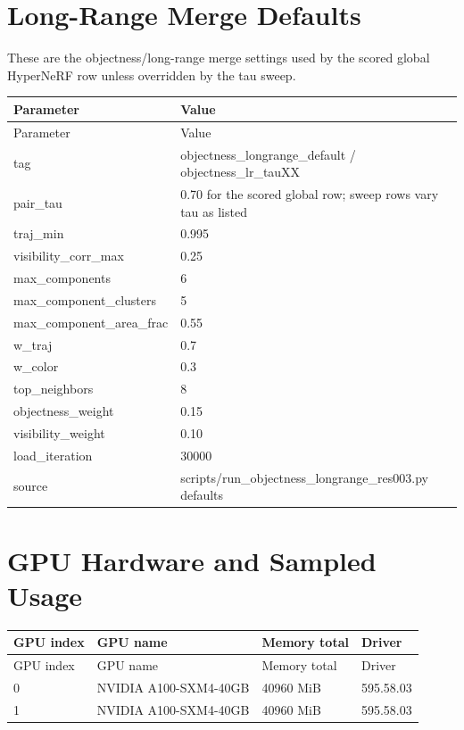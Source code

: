 \documentclass[10pt]{article}
\begin{document}
\section{Long-Range Merge Defaults}
These are the objectness/long-range merge settings used by the scored global HyperNeRF row unless overridden by the tau sweep.
\small
\begin{longtable}{lp{18cm}}
\toprule
Parameter & Value \\
\midrule
\endfirsthead
\toprule
Parameter & Value \\
\midrule
\endhead
tag & objectness\_longrange\_default / objectness\_lr\_tauXX \\
pair\_tau & 0.70 for the scored global row; sweep rows vary tau as listed \\
traj\_min & 0.995 \\
visibility\_corr\_max & 0.25 \\
max\_components & 6 \\
max\_component\_clusters & 5 \\
max\_component\_area\_frac & 0.55 \\
w\_traj & 0.7 \\
w\_color & 0.3 \\
top\_neighbors & 8 \\
objectness\_weight & 0.15 \\
visibility\_weight & 0.10 \\
load\_iteration & 30000 \\
source & scripts/run\_objectness\_longrange\_res003.py defaults \\
\bottomrule
\end{longtable}
\normalsize

\section{GPU Hardware and Sampled Usage}
\small
\begin{longtable}{llll}
\toprule
GPU index & GPU name & Memory total & Driver \\
\midrule
\endfirsthead
\toprule
GPU index & GPU name & Memory total & Driver \\
\midrule
\endhead
0 & NVIDIA A100-SXM4-40GB & 40960 MiB & 595.58.03 \\
1 & NVIDIA A100-SXM4-40GB & 40960 MiB & 595.58.03 \\
\bottomrule
\end{longtable}
\normalsize
\end{document}
